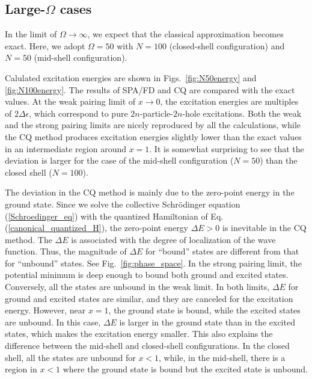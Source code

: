 \documentclass[%
superscriptaddress,
preprint,
showpacs,
nofootinbib,
amsmath,amssymb,
prc,
floatfix ]%
{revtex4-1}
\begin{document}
\subsection{Large-$\Omega$ cases}

In the limit of $\Omega\rightarrow\infty$,
we expect that the classical approximation becomes exact.
Here, we adopt $\Omega=50$ with $N=100$ (closed-shell configuration)
and $N=50$ (mid-shell configuration).

Calulated excitation energies are shown in Figs.~\ref{fig:N50energy}
and \ref{fig:N100energy}.
The results of SPA/FD and CQ are compared with the exact values.
At the weak pairing limit of $x\rightarrow 0$,
the excitation energies are multiples of $2\Delta\epsilon$, 
which correspond to pure $2n$-particle-$2n$-hole excitations.
Both the weak and the strong pairing limits
are nicely reproduced by all the calculations,
while the CQ method produces excitation energies slightly lower than the
exact values in an intermediate region around $x=1$.
It is somewhat surprising to see that the deviation is larger for
the case of the mid-shell configuration ($N=50$) than the closed shell
($N=100$).


The deviation in the CQ method is mainly due to the zero-point energy
in the ground state.
Since we solve the collective Schr\"odinger equation (\ref{Schroedinger_eq})
with the quantized Hamiltonian of Eq. (\ref{canonical_quantized_H}),
the zero-point energy $\Delta E>0$ is inevitable in the CQ method.
The $\Delta E$ is associated with the degree of localization of
the wave function.
Thus, the magnitude of $\Delta E$ for ``bound'' states are different
from that for ``unbound'' states.
See Fig.~\ref{fig:phase_space}.
In the strong pairing limit, the potential minimum is deep enough to bound
both ground and excited states.
Conversely, all the states are unbound in the weak limit.
In both limits, $\Delta E$ for ground and excited states are similar,
and they are canceled for the excitation energy.
However, near $x=1$, the ground state is bound,
while the excited states are unbound.
In this case, $\Delta E$ is larger in the ground state than in the
excited states, which makes the excitation energy smaller.
This also explains the difference between the mid-shell and closed-shell
configurations.
In the closed shell, all the states are unbound for $x<1$,
while, in the mid-shell,
there is a region in $x<1$ where the ground state is bound but
the excited state is unbound.
\end{document}
